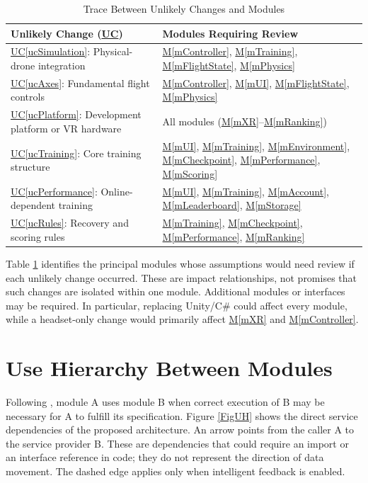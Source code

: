 \documentclass[12pt, titlepage]{article}
\DeclareRobustCommand{\mgabbr}[2]{\hyperlink{mg-abbr:#1}{#2}}
\newcommand{\uref}[1]{\mgabbr{uc}{UC}\ref{#1}}
\newcommand{\mref}[1]{\hyperref[#1]{M\ref*{#1}}}
\begin{document}
\begin{table}[H]
\centering
\small
\renewcommand{\arraystretch}{1.2}
\begin{tabularx}{\textwidth}{p{} X}
\toprule
\textbf{Unlikely Change (\mgabbr{uc}{UC})} & \textbf{Modules Requiring Review}
\\
\midrule
\uref{ucSimulation}: Physical-drone integration
& \mref{mController}, \mref{mTraining}, \mref{mFlightState},
  \mref{mPhysics} \\
\uref{ucAxes}: Fundamental flight controls
& \mref{mController}, \mref{mUI}, \mref{mFlightState},
  \mref{mPhysics} \\
\uref{ucPlatform}: Development platform or VR hardware
& All modules (\mref{mXR}--\mref{mRanking}) \\
\uref{ucTraining}: Core training structure
& \mref{mUI}, \mref{mTraining}, \mref{mEnvironment},
  \mref{mCheckpoint}, \mref{mPerformance}, \mref{mScoring} \\
\uref{ucPerformance}: Online-dependent training
& \mref{mUI}, \mref{mTraining}, \mref{mAccount},
  \mref{mLeaderboard}, \mref{mStorage} \\
\uref{ucRules}: Recovery and scoring rules
& \mref{mTraining}, \mref{mCheckpoint}, \mref{mPerformance},
  \mref{mRanking} \\
\bottomrule
\end{tabularx}
\caption{Trace Between Unlikely Changes and Modules}
\label{TblUCT}
\end{table}

Table \ref{TblUCT} identifies the principal modules whose assumptions
would need review if each unlikely change occurred. These are impact
relationships, not promises that such changes are isolated within one
module. Additional modules or interfaces may be required. In particular,
replacing Unity/C\# could affect every module, while a headset-only change
would primarily affect \mref{mXR} and \mref{mController}.




\section{Use Hierarchy Between Modules} \label{SecUse}

Following \citet{Parnas1978}, module A uses module B when correct
execution of B may be necessary for A to fulfill its specification.
Figure \ref{FigUH} shows the direct service dependencies of the proposed
architecture. An arrow points from the caller A to the service provider B.
These are dependencies that could require an import or an interface
reference in code; they do not represent the direction of data movement.
The dashed edge applies only when intelligent feedback is enabled.
\end{document}
